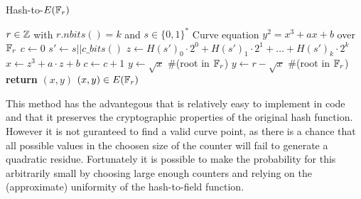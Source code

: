 \begin{algorithm}\caption{Hash-to-$E(\mathbb{F}_r)$}
\label{alg_projective_group_law}
\begin{algorithmic}[0]
\Require $r \in \mathbb{Z}$ with $r.nbits()=k$ and $s\in\{0,1\}^*$
\Require Curve equation $y^2 = x^3 + ax +b$ over $\mathbb{F}_r$
\State $c \gets 0$
\Repeat
\State $s' \gets s||c\_bits()$
\State $z \gets H(s')_0\cdot 2^0 + H(s')_1\cdot 2^1 + \ldots + H(s')_{k}\cdot 2^{k}$
\State $x\gets z^3 + a\cdot z + b$
\State $c\gets c+1$
\State $y \gets \sqrt{x}$ \#(root in $\mathbb{F}_r$)
\Else 
\State $y \gets r-\sqrt{x}$ \#(root in $\mathbb{F}_r$)
\EndIf
\State \textbf{return} $(x,y)$
\EndProcedure
\Ensure $(x,y)\in E(\mathbb{F}_r)$
\end{algorithmic}
\end{algorithm}

This method has the advantegous that is relatively easy to implement in code and that it preserves the cryptographic properties of the original hash function. However it is not guranteed to find a valid curve point, as there is a chance that all possible values in the choosen size of the counter will fail to generate a quadratic residue. Fortunately it is possible to make the probability for this arbitrarily small by choosing large enough counters and relying on the (approximate) uniformity of the hash-to-field function. 



